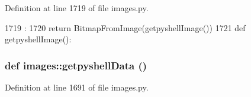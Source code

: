 Definition at line 1719 of file images.py.


\begin{DoxyCode}
1719                       :
1720     return BitmapFromImage(getpyshellImage())
1721 
def getpyshellImage():
\end{DoxyCode}
\hypertarget{namespaceimages_a30b919acc7a3c962042932236cbbc135}{
\subsubsection[{getpyshellData}]{\setlength{\rightskip}{0pt plus 5cm}def images::getpyshellData ()}}
\label{namespaceimages_a30b919acc7a3c962042932236cbbc135}


Definition at line 1691 of file images.py.


